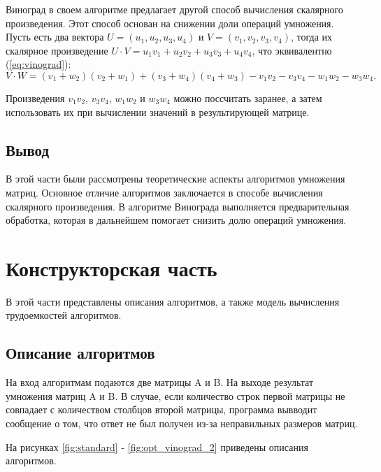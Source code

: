 \documentclass{article}
\begin{document}
Виноград в своем алгоритме предлагает другой способ вычисления скалярного произведения. Этот способ основан на
снижении доли операций умножения. Пусть есть два вектора $U = (u_1, u_2, u_3, u_4)$ и $V = (v_1, v_2, v_3, v_4)$, тогда их
скалярное произведение $U \cdot V = u_1v_1 + u_2v_2 + u_3v_3 + u_4v_4$, что эквивалентно (\ref{eq:vinograd}):
\begin{equation}
	\label{eq:vinograd}
	V \cdot W = (v_1 + w_2)(v_2 + w_1) + (v_3 + w_4)(v_4 + w_3) - v_1v_2 - v_3v_4 - w_1w_2 - w_3w_4.
\end{equation}

Произведения $v_1v_2$, $v_3v_4$, $w_1w_2$ и $w_3w_4$ можно поссчитать заранее, а затем использовать их при
вычислении значений в результирующей матрице.

\subsection{Вывод}
В этой части были рассмотрены теоретические аспекты алгоритмов умножения матриц. Основное отличие алгоритмов
заключается в способе вычисления скалярного произведения. В алгоритме Винограда выполняется предварительная обработка,
которая в дальнейшем помогает снизить долю операций умножения.


\clearpage\section{Конструкторская часть}
В этой части представлены описания алгоритмов, а также модель вычисления трудоемкостей алгоритмов.

\subsection{Описание алгоритмов}
На вход алгоритмам подаются две матрицы A и B. На выходе результат умножения матриц A и B. В случае, если количество
строк первой матрицы не совпадает с количеством столбцов второй матрицы, программа вывводит сообщение о том, что ответ
не был получен из-за неправильных размеров матриц.

На рисунках \ref{fig:standard} - \ref{fig:opt_vinograd_2} приведены описания алгоритмов.
\end{document}
